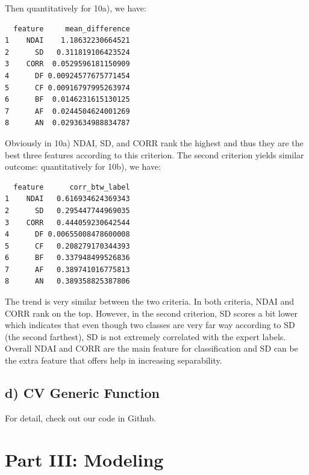 \documentclass[jou]{apa}%
\begin{document}
Then quantitatively for 10a), we have:
\begin{verbatim}
  feature     mean_difference
1    NDAI    1.18632230664521
2      SD   0.311819106423524
3    CORR  0.0529596181150909
4      DF 0.00924577675771454
5      CF 0.00916797995263974
6      BF  0.0146231615130125
7      AF  0.0244504624001269
8      AN  0.0293634988834787
\end{verbatim}
Obviously in 10a) NDAI, SD, and CORR rank the highest and thus they are the best three features according to this criterion. The second criterion yields similar outcome:
quantitatively for 10b), we have:
\begin{verbatim}
  feature      corr_btw_label
1    NDAI   0.616934624369343
2      SD   0.295447744969035
3    CORR   0.444059230642544
4      DF 0.00655008478600008
5      CF   0.208279170344393
6      BF   0.337948499526836
7      AF   0.389741016775813
8      AN   0.389358825387806
\end{verbatim}
The trend is very similar between the two criteria. In both criteria, NDAI and CORR rank on the top. However, in the second criterion, SD scores a bit lower which indicates that even though two classes are very far way according to SD (the second farthest), SD is not extremely correlated with the expert labels. Overall NDAI and CORR are the main feature for classification and SD can be the extra feature that offers help in increasing separability.

\subsection{d) CV Generic Function}
For detail, check out our code in Github.

\section{\textbf{Part III: Modeling}}
\end{document}
